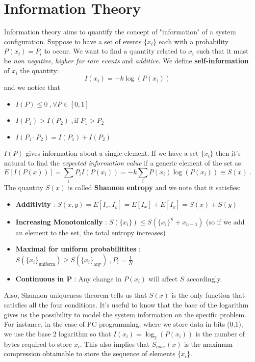 \documentclass[12pt,a4paper]{article}
\begin{document}
\section{Information Theory}
Information theory aims to quantify the concept of "information" of a system configuration. Suppose to have a set of events $\{x_i\}$ each with a probability $P(x_i)=P_i$ to occur. We want to find a quantity related to $x_i$ such that it must be \textit{non negative}, \textit{higher for rare events} and \textit{additive}. We define \textbf{self-information} of $x_i$ the quantity:
$$
I(x_i) = -k \log (P(x_i))
$$
and we notice that
\begin{itemize}
	\item $I(P)\leq 0 \;, \forall P\in [0,1]$
	\item $I(P_1)>I(P_2) \;, \text{if } P_1>P_2$
	\item $I(P_1\cdot P_2) = I(P_1) + I(P_2)$
\end{itemize}
$I(P)$ gives information about a single element. If we have a set $\{x_i\}$ then it's natural to find the \textit{expected information value} if a generic element of the set as:
$$
E[I(P(x))] = \sum_{i} P_i I(P(x_i)) = -k \sum_{i} P(x_i) \log(P(x_i)) \equiv S(x)\;.
$$
The quantity $S(x)$ is called \textbf{Shannon entropy} and we note that it satisfies:
\begin{itemize}
	\item \textbf{Additivity} : $S(x,y) = E[I_x,I_y] = E[I_x] + E[I_y] = S(x)+S(y)$
	\item \textbf{Increasing Monotonically} : $S(\{x_i\})\leq S(\{x_i\}^n+x_{n+1})$ (so if we add an element to the set, the total entropy increases)
	\item \textbf{Maximal for uniform probabilitites} : $S(\{x_i\}_{\text{uniform}}) \geq S(\{x_i\}_{\text{any}})\;, P_i = \frac{1}{N}$
	\item \textbf{Continuous in P} : Any change in $P(x_i)$ will affect $S$ accordingly.
\end{itemize}

Also, Shannon uniqueness theorem tells us that $S(x)$ is the only function that satisfies all the four conditions.
It's useful to know that the base of the logarithm gives us the possibility to model the system information on the specific problem. For instance, in the case of PC programming, where we store data in bits (0,1), we use the base $2$ logarithm so that $I(x_i)=\log_2(P(x_i))$ is the number of bytes required to store $x_i$. This also implies that $S_{max}(x)$ is the maximum compression obtainable to store the sequence of elements $\{x_i\}$.
\end{document}
